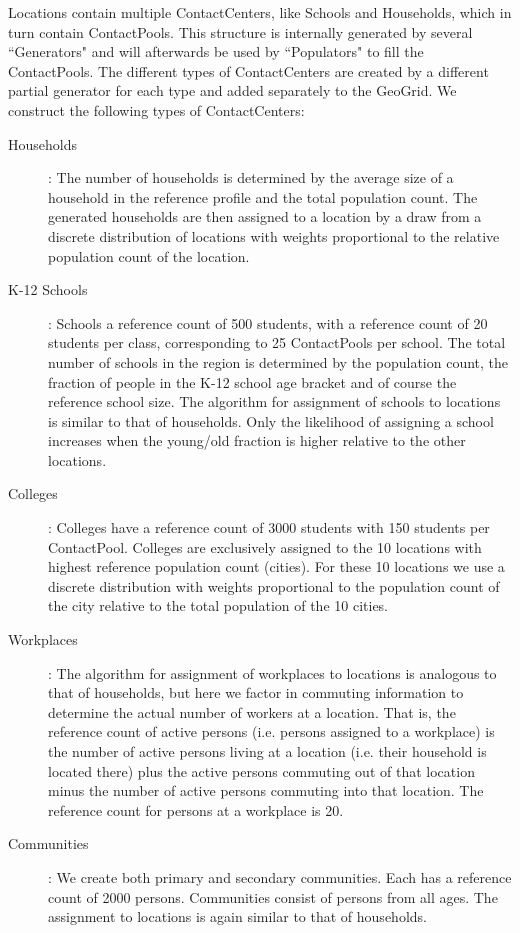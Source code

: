 Locations contain multiple ContactCenters, like Schools and Households, which in turn contain ContactPools.
This structure is internally generated by several ``Generators" and will afterwards be used by ``Populators" to fill the ContactPools. The different types of ContactCenters are created by a different partial generator for each type and added separately to the GeoGrid. We construct the following types of ContactCenters:

\begin{description}
    \item[Households]:
        The number of households is determined by the average size of a household in the reference
        profile and the total population count.
        The generated households are then assigned to a location by a draw from a discrete distribution of
        locations with weights proportional to the  relative population count of the location.
    \item[K-12 Schools]:
        Schools a reference count of 500 students, with a reference count of 20 students per class,
         corresponding to 25 ContactPools per school.
         The total number of schools in the region is determined by the population count, the fraction
         of people in the K-12 school age bracket and of course the reference school size.
        The algorithm for assignment of schools to locations is similar to that of households.
        Only the likelihood of assigning a school increases when the young/old fraction is higher relative to the other locations.
    \item[Colleges]:
        Colleges have a reference count of 3000 students with 150 students per ContactPool.
        Colleges are exclusively assigned to the 10 locations with highest reference population count (cities).
        For these 10 locations we use a discrete distribution with weights proportional to the population count
        of the city relative to the total population of the 10 cities.
    \item[Workplaces]:
        The algorithm for assignment of workplaces to locations is analogous to that of households,
        but here we factor in commuting information to determine the actual number of workers at a location.
        That is, the reference count of active persons (i.e. persons assigned to a workplace) is
        the number of active persons living at a location (i.e. their household is located there)
        plus the active persons commuting out of that location minus the number of active persons
        commuting into that location.
        The reference count for persons at a workplace is 20.
    \item[Communities]:
        We create both primary and secondary communities. Each has a  reference count of 2000 persons.
        Communities consist of persons from all ages.
        The assignment to locations is again similar to that of households.
\end{description}

